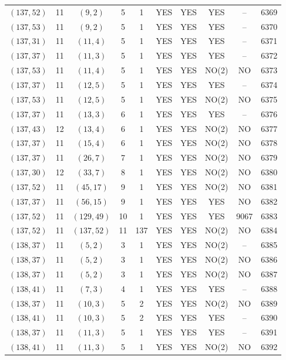\begin{longtable}{|c|c|c|c|c|c|c|c|c|c|}
$(137, 52)$ & 11 & $(9, 2)$ & 5 & 1 & YES & YES & YES & -- & 6369\\
$(137, 53)$ & 11 & $(9, 2)$ & 5 & 1 & YES & YES & YES & -- & 6370\\
$(137, 31)$ & 11 & $(11, 4)$ & 5 & 1 & YES & YES & YES & -- & 6371\\
$(137, 37)$ & 11 & $(11, 3)$ & 5 & 1 & YES & YES & YES & -- & 6372\\
$(137, 53)$ & 11 & $(11, 4)$ & 5 & 1 & YES & YES & NO(2) & NO & 6373\\
$(137, 37)$ & 11 & $(12, 5)$ & 5 & 1 & YES & YES & YES & -- & 6374\\
$(137, 53)$ & 11 & $(12, 5)$ & 5 & 1 & YES & YES & NO(2) & NO & 6375\\
$(137, 37)$ & 11 & $(13, 3)$ & 6 & 1 & YES & YES & YES & -- & 6376\\
$(137, 43)$ & 12 & $(13, 4)$ & 6 & 1 & YES & YES & NO(2) & NO & 6377\\
$(137, 37)$ & 11 & $(15, 4)$ & 6 & 1 & YES & YES & NO(2) & NO & 6378\\
$(137, 37)$ & 11 & $(26, 7)$ & 7 & 1 & YES & YES & NO(2) & NO & 6379\\
$(137, 30)$ & 12 & $(33, 7)$ & 8 & 1 & YES & YES & NO(2) & NO & 6380\\
$(137, 52)$ & 11 & $(45, 17)$ & 9 & 1 & YES & YES & NO(2) & NO & 6381\\
$(137, 37)$ & 11 & $(56, 15)$ & 9 & 1 & YES & YES & YES & NO & 6382\\
$(137, 52)$ & 11 & $(129, 49)$ & 10 & 1 & YES & YES & YES & 9067 & 6383\\
$(137, 52)$ & 11 & $(137, 52)$ & 11 & 137 & YES & YES & NO(2) & NO & 6384\\
$(138, 37)$ & 11 & $(5, 2)$ & 3 & 1 & YES & YES & NO(2) & -- & 6385\\
$(138, 37)$ & 11 & $(5, 2)$ & 3 & 1 & YES & YES & NO(2) & NO & 6386\\
$(138, 37)$ & 11 & $(5, 2)$ & 3 & 1 & YES & YES & NO(2) & NO & 6387\\
$(138, 41)$ & 11 & $(7, 3)$ & 4 & 1 & YES & YES & YES & -- & 6388\\
$(138, 37)$ & 11 & $(10, 3)$ & 5 & 2 & YES & YES & NO(2) & NO & 6389\\
$(138, 41)$ & 11 & $(10, 3)$ & 5 & 2 & YES & YES & YES & -- & 6390\\
$(138, 37)$ & 11 & $(11, 3)$ & 5 & 1 & YES & YES & YES & -- & 6391\\
$(138, 41)$ & 11 & $(11, 3)$ & 5 & 1 & YES & YES & NO(2) & NO & 6392\\

\end{longtable}

